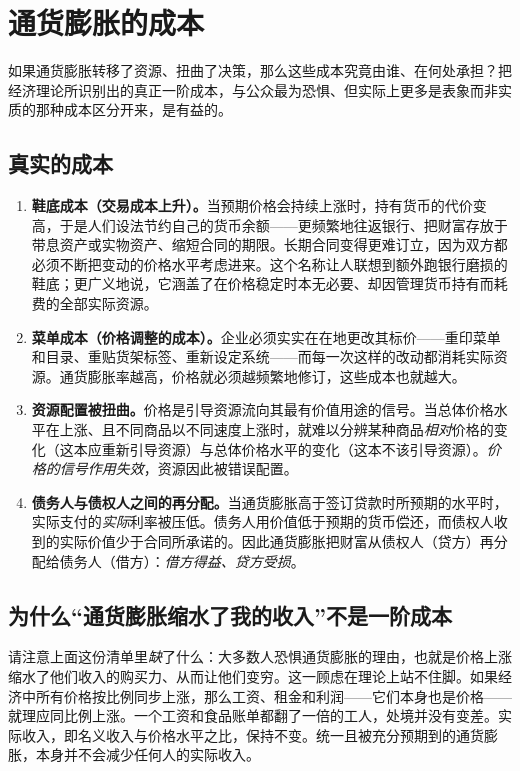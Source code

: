 \section{通货膨胀的成本}

如果通货膨胀转移了资源、扭曲了决策，那么这些成本究竟由谁、在何处承担？把经济理论所识别出的真正一阶成本，与公众最为恐惧、但实际上更多是表象而非实质的那种成本区分开来，是有益的。

\subsection{真实的成本}

\begin{enumerate}
    \item \textbf{鞋底成本（交易成本上升）。}当预期价格会持续上涨时，持有货币的代价变高，于是人们设法节约自己的货币余额——更频繁地往返银行、把财富存放于带息资产或实物资产、缩短合同的期限。长期合同变得更难订立，因为双方都必须不断把变动的价格水平考虑进来。这个名称让人联想到额外跑银行磨损的鞋底；更广义地说，它涵盖了在价格稳定时本无必要、却因管理货币持有而耗费的全部实际资源。

    \item \textbf{菜单成本（价格调整的成本）。}企业必须实实在在地更改其标价——重印菜单和目录、重贴货架标签、重新设定系统——而每一次这样的改动都消耗实际资源。通货膨胀率越高，价格就必须越频繁地修订，这些成本也就越大。

    \item \textbf{资源配置被扭曲。}价格是引导资源流向其最有价值用途的信号。当总体价格水平在上涨、且不同商品以不同速度上涨时，就难以分辨某种商品\emph{相对}价格的变化（这本应重新引导资源）与总体价格水平的变化（这本不该引导资源）。\emph{价格的信号作用失效}，资源因此被错误配置。

    \item \textbf{债务人与债权人之间的再分配。}当通货膨胀高于签订贷款时所预期的水平时，实际支付的\emph{实际}利率被压低。债务人用价值低于预期的货币偿还，而债权人收到的实际价值少于合同所承诺的。因此通货膨胀把财富从债权人（贷方）再分配给债务人（借方）：\emph{借方得益、贷方受损}。
\end{enumerate}

\subsection{为什么“通货膨胀缩水了我的收入”不是一阶成本}

请注意上面这份清单里\emph{缺}了什么：大多数人恐惧通货膨胀的理由，也就是价格上涨缩水了他们收入的购买力、从而让他们变穷。这一顾虑在理论上站不住脚。如果经济中所有价格按比例同步上涨，那么工资、租金和利润——它们本身也是价格——就理应同比例上涨。一个工资和食品账单都翻了一倍的工人，处境并没有变差。实际收入，即名义收入与价格水平之比，保持不变。统一且被充分预期到的通货膨胀，本身并不会减少任何人的实际收入。

